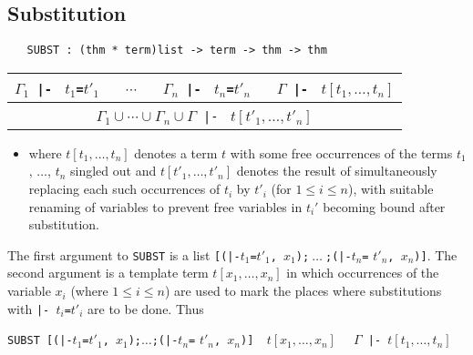 \bigskip

\subsection{Substitution}

\begin{boxed}
\begin{verbatim}
   SUBST : (thm * term)list -> term -> thm -> thm
\end{verbatim}\end{boxed}

\begin{center}
\begin{tabular}{c}
$\Gamma_1${\small\verb+ |- +} $t_1${\small\verb+=+}$t'_1$ {\small\verb+  +} $\cdots$ {\small\verb+  +}
$\Gamma_n${\small\verb+ |- +} $t_n${\small\verb+=+}$t'_n$ {\small\verb+  +}
$\Gamma${\small\verb+ |- +} $t[t_1,\ldots,t_n]$ \\ \hline
$\Gamma_1 \cup \cdots
\cup \Gamma_n \cup \Gamma${\small\verb+ |- +} $t[t'_1,\ldots,t'_n]$ \\
\end{tabular}
\end{center}

\bigskip

\begin{itemize}
\item where $t[t_1,\ldots,t_n]$ denotes a term $t$ with some free
occurrences of the terms $t_1$, $\dots$, $t_n$ singled out and
$t[t'_1,\ldots,t'_n]$ denotes the result of simultaneously replacing each
such occurrences of $t_i$ by $t'_i$ (for $1{\leq}i {\leq} n$),
with suitable renaming of variables to prevent free variables
in $t_i'$ becoming bound after substitution.
\end{itemize}

\noindent
The first argument to {\small\verb+SUBST+} is a list
{\small\verb+[(|-+}$t_1${\small\verb+=+}$t'_1${\small\verb+, +}$x_1${\small\verb+);+}$\:\ldots\:${\small\verb+;(|-+}$t_n${\small\verb+=+}
$t'_n${\small\verb+, +}$x_n${\small\verb+)]+}.  The second argument is a
template term $t[x_1,\ldots,x_n]$ in which occurrences of the variable
$x_i$ (where $1 \leq i\leq n$) are used to mark the places where
substitutions with {\small\verb+|- +}$t_i${\small\verb+=+}$t'_i$ are to be
done. Thus

\bigskip

{\small\verb+SUBST [(|-+}$t_1${\small\verb+=+}$t'_1${\small\verb+, +}$x_1${\small\verb+);+}$\ldots${\small\verb+;(|-+}$t_n${\small\verb+=+}
$t'_n${\small\verb+, +}$x_n${\small\verb+)]  +}$t[x_1,\ldots,x_n]${\small\verb+  +}
$\Gamma${\small\verb+ |- +}$t[t_1,\ldots,t_n]$

